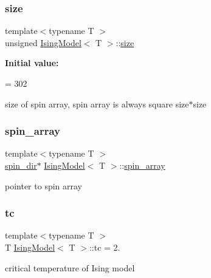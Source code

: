 \mbox{\label{classIsingModel_aec6fc4774dda94fd23c6e29d0820b63a}} 
\subsubsection{\texorpdfstring{size}{size}}
{\footnotesize\ttfamily template$<$typename T $>$ \\
unsigned \mbox{\hyperlink{classIsingModel}{Ising\+Model}}$<$ T $>$\+::\mbox{\hyperlink{glad_8h_adead0e00f1033fff2918e18853add2b1}{size}}\hspace{0.3cm}{\ttfamily [private]}}

{\bfseries Initial value\+:}
\begin{DoxyCode}
=
        302
\end{DoxyCode}
size of spin array, spin array is always square size$\ast$size \mbox{\label{classIsingModel_a82425f60fa2dd07995c2a53f8a850cf5}} 
\subsubsection{\texorpdfstring{spin\+\_\+array}{spin\_array}}
{\footnotesize\ttfamily template$<$typename T $>$ \\
\mbox{\hyperlink{classspin__dir}{spin\+\_\+dir}}$\ast$ \mbox{\hyperlink{classIsingModel}{Ising\+Model}}$<$ T $>$\+::\mbox{\hyperlink{classspin__array}{spin\+\_\+array}}\hspace{0.3cm}{\ttfamily [private]}}

pointer to spin array \mbox{\label{classIsingModel_af19ba376c01404c094c214939eafd7a5}} 
\subsubsection{\texorpdfstring{tc}{tc}}
{\footnotesize\ttfamily template$<$typename T $>$ \\
T \mbox{\hyperlink{classIsingModel}{Ising\+Model}}$<$ T $>$\+::tc = 2.\hspace{0.3cm}{\ttfamily [private]}}

critical temperature of Ising model \mbox{\label{classIsingModel_a756faa94432cc7e10d21e52a03156569}} 
